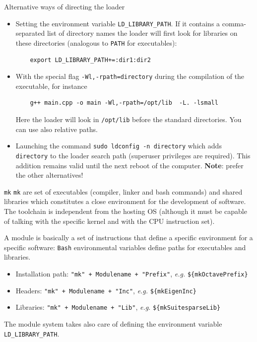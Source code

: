\documentclass[12pt,aspectratio=169]{beamer}
\begin{document}
  \begin{frame}[fragile]{Alternative ways of directing the loader}
    \begin{itemize}
    \item Setting the environment variable \texttt{LD\_LIBRARY\_PATH}. If
      it contains a comma-separated list of directory names the
      loader will first look for libraries on these directories (analogous to \texttt{PATH} for executables):
  \begin{verbatim}
    export LD_LIBRARY_PATH+=:dir1:dir2
  \end{verbatim}
  \item With the special flag \texttt{-Wl,-rpath=directory}
    during the compilation of the executable, for instance
  \begin{verbatim}
    g++ main.cpp -o main -Wl,-rpath=/opt/lib  -L. -lsmall
  \end{verbatim}
  Here the loader will look in \texttt{/opt/lib} before the standard directories. You can use also relative paths.
  \item Launching the command \texttt{sudo ldconfig -n directory} which adds \texttt{directory} to the loader search path (superuser privileges are required). This addition remains valid until the next reboot of the computer. \textbf{Note}: prefer the other alternatives!
    \end{itemize}
  \end{frame}

  
  \begin{frame}{\texttt{mk}}
    \texttt{mk} are set of executables (compiler, linker and bash commands) and shared libraries which constitutes a close environment for the development of software. The toolchain is independent from the hosting OS (although it must be capable of talking with the specific kernel and with the CPU instruction set).

    \smallskip
  
    A module is basically a set of instructions that define a specific environment for a specific software: \texttt{Bash} environmental variables define paths for executables and libraries. 
    
    \begin{itemize}
      \item Installation path: \texttt{"mk" + Modulename + "Prefix"}, \textit{e.g.} \texttt{\$\{mkOctavePrefix\}}
      \item Headers: \texttt{"mk" + Modulename + "Inc"}, \textit{e.g.} \texttt{\$\{mkEigenInc\}}
      \item Libraries: \texttt{"mk" + Modulename + "Lib"}, \textit{e.g.} \texttt{\$\{mkSuitesparseLib\}}
    \end{itemize}

    
    The module system takes also care of defining the environment variable \texttt{LD\_LIBRARY\_PATH}.
  
  \end{frame}
\end{document}
